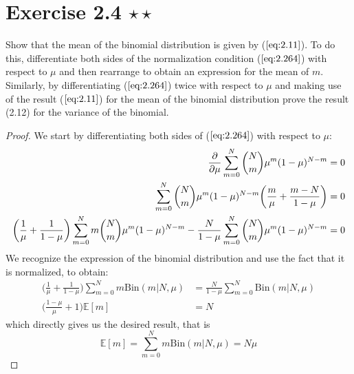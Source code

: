 \section*{Exercise 2.4 $\star \star$}
Show that the mean of the binomial distribution is given by
($\ref{eq:2.11}$). To do this, differentiate both sides of the normalization condition
($\ref{eq:2.264}$) with respect to $\mu$ and then rearrange to obtain an
expression for the mean of $m$. Similarly, by differentiating ($\ref{eq:2.264}$)
twice with respect to $\mu$ and making use of the result ($\ref{eq:2.11}$) for the mean
of the binomial distribution prove the result (2.12) for the variance of the binomial.

\begin{proof}
    We start by differentiating both sides of ($\ref{eq:2.264}$)
    with respect to $\mu$:
    \begin{align*}
        \pdv{\mu} \sum_{m=0}^{N} \binom{N}{m} \mu^m(1-\mu)^{N - m} &= 0 \\
        \sum_{m=0}^{N} \binom{N}{m} \mu^m(1 - \mu)^{N - m}
        \bigg(\frac{m}{\mu} + \frac{m-N}{1-\mu}\bigg) &= 0 \\
        \bigg(\frac{1}{\mu} + \frac{1}{1 - \mu}\bigg)
        \sum_{m=0}^{N} m \binom{N}{m} \mu^m(1 - \mu)^{N - m} 
        - \frac{N}{1-\mu} \sum_{m=0}^{N} \binom{N}{m} \mu^m(1 - \mu)^{N - m} &= 0
    \end{align*}
    We recognize the expression of the binomial distribution and
    use the fact that it is normalized, to obtain:
    \begin{align*}
        \bigg(\frac{1}{\mu} + \frac{1}{1 - \mu}\bigg)
        \sum_{m=0}^{N} m\text{Bin}(m | N, \mu) 
        &= \frac{N}{1-\mu} \sum_{m=0}^{N} \text{Bin}(m | N, \mu) \\
        \bigg(\frac{1 - \mu}{\mu} + 1\bigg) \mathbb{E}[m] &= N
    \end{align*}
    which directly gives us the desired result, that is
    \begin{equation*}
        \mathbb{E}[m] = \sum_{m=0}^{N} m\text{Bin}(m | N, \mu) = N\mu
        \tag{2.11}\label{eq:2.11}
    \end{equation*}


\end{proof}
